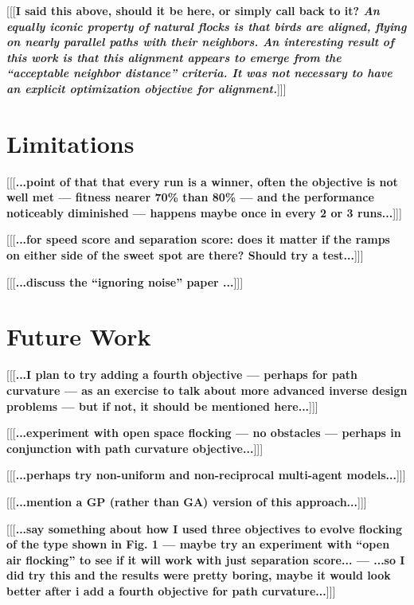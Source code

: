 \documentclass[letterpaper]{article}
\begin{document}
[[[\textbf{I said this above, should it be here, or simply call back to it? \textit{An equally iconic property of natural flocks is that birds are aligned, flying on nearly parallel paths with their neighbors. An interesting result of this work is that this alignment appears to \textit{emerge} from the ``acceptable neighbor distance'' criteria. It was \textbf{not} necessary to have an explicit optimization objective for alignment.}}]]]

\section{Limitations}
\label{sec:limitations}

[[[\textbf{...point of that that every run is a winner, often the objective is not well met --- fitness nearer 70\% than 80\% --- and the performance noticeably diminished --- happens maybe once in every 2 or 3 runs...}]]]

[[[\textbf{...for speed score and separation score: does it matter if the ramps on either side of the sweet spot are there? Should try a test...}]]]

[[[\textbf{...discuss the ``ignoring noise'' paper \citep{antipov_evolutionary_2025}...}]]]

\section{Future Work}
\label{sec:future}

[[[\textbf{...I plan to try adding a fourth objective --- perhaps for path curvature --- as an exercise to talk about more advanced inverse design problems --- but if not, it should be mentioned here...}]]]

[[[\textbf{...experiment with open space flocking --- no obstacles --- perhaps in conjunction with path curvature objective...}]]]

[[[\textbf{...perhaps try non-uniform \citep{montanari_optimal_2025} and non-reciprocal \citep{choi_flocking_2025} multi-agent models...}]]]

[[[\textbf{...mention a GP (rather than GA) version of this approach...}]]]

[[[\textbf{...say something about how I used three objectives to evolve flocking of the type shown in Fig. 1 --- maybe try an experiment with ``open air flocking'' to see if it will work with just separation score... --- ...so I did try this and the results were pretty boring, maybe it would look better after i add a fourth objective for path curvature...}]]]
\end{document}

